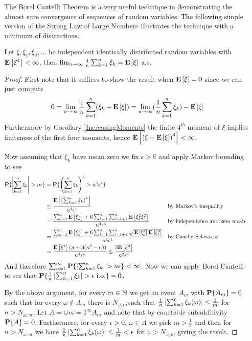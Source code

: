 The Borel Cantelli Theorem is a very useful technique in demonstrating
the almost sure convergence of sequences of random variables.  The
following simple version of the Strong Law of Large Numbers
illustrates the technique with a minimum of distractions.
\begin{lem}\label{SLLNL4}Let $\xi, \xi_1, \xi_2, \dots$ be independent identically
  distributed random variables with $\textbf{E}\left[\xi^4\right] < \infty$,
  then $\lim_{n \to \infty} \frac{1}{n} \sum_{k=1}^n \xi_k =
  \textbf{E}\left[\xi\right]$ a.s.
\end{lem}
\begin{proof}
First note that it suffices to show the result when $\textbf{E}\left[\xi\right]
= 0$ since we can just compute
\begin{align*}
0 = \lim_{n \to \infty} \frac{1}{n} \sum_{k=1}^n (\xi_k -
\textbf{E}\left[\xi\right]) = 
\lim_{n \to \infty} (\frac{1}{n} \sum_{k=1}^n \xi_k) -
\textbf{E}\left[\xi\right]
\end{align*}
Furthermore by Corollary \ref{IncreasingMoments} the finite $4^{th}$ moment of $\xi$ implies finiteness of
the first four moments, hence $\textbf{E}\left[\left (\xi -
    \textbf{E}\left[\xi\right]\right )^4\right] <
\infty$.

Now assuming that $\xi_k$ have mean zero we fix $\epsilon > 0$ and apply Markov
bounding to see
\begin{align*}
\textbf{P}\{\left \vert \sum_{k=1}^n \xi_k \right \vert > n \epsilon\} &=
\textbf{P}\{\left ( \sum_{k=1}^n \xi_k \right ) ^4  > n^4 \epsilon^4\} \\
&\leq \frac{\textbf{E}\left[\left ( \sum_{k=1}^n \xi_k \right )^4\right]}{ n^4 \epsilon^4}
& & \text{by Markov's inequality}
\\
&= \frac{\sum_{k=1}^n\textbf{E}\left[\xi_k^4\right]+6\sum_{k=1}^n
 \sum_{l=k+1}^n\textbf{E}\left[\xi_k^2 \xi_l^2\right]}{ n^4 \epsilon^4} & &
\text{by independence and zero mean} \\
&= \frac{\sum_{k=1}^n\textbf{E}\left[\xi_k^4\right]+6\sum_{k=1}^n
 \sum_{l=k+1}^n\sqrt{\textbf{E}\left[\xi_k^4\right] \textbf{E}\left[\xi_l^4\right]}}{ n^4 \epsilon^4} & &
\text{by Cauchy Schwartz} \\
&= \frac{\textbf{E}\left[\xi^4\right](n + 3(n^2 -n))}{ n^4 \epsilon^4} \leq \frac{3\textbf{E}\left[\xi^4\right]}{ n^2 \epsilon^4} \\
\end{align*}
And therefore $\sum_{n=1}^\infty \textbf{P}\{\left \vert \sum_{k=1}^n \xi_k \right \vert
  > n \epsilon\}  < \infty$.  Now we can apply Borel Cantelli to see
that $\textbf{P}\{\frac{1}{n}\left \vert \sum_{k=1}^n \xi_k
     \right \vert > \epsilon \text{ i.o.}\} = 0$.

By the above argument, for every $m \in \mathbb{N}$ we get an event
$A_m$ with $\textbf{P}\{A_m\} = 0$ such that for every $\omega \notin
A_m$ there is $N_{\omega,m}$such that $\frac{1}{n}\left \vert \sum_{k=1}^n
  \xi_k(\omega) \right \vert \leq \frac{1}{m}$ for $n > N_{\omega,m}$.  Let $A =
\cup{m=1}^\infty A_m$ and note that by countable subadditivity
$\textbf{P}\{A\} = 0$.  Furthermore, for every $\epsilon > 0$, $\omega
\in A$ we pick $m > \frac{1}{\epsilon}$ and then for $n > N_{\omega,
  m}$ we have $\frac{1}{n}\left \vert \sum_{k=1}^n
  \xi_k(\omega) \right \vert \leq \frac{1}{m} < \epsilon$ for $n > N_{\omega,m}$
giving the result.
\end{proof}
